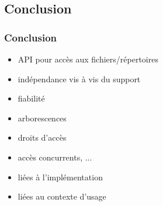 \subsection{Conclusion}
\begin{frame}
  \frametitle{Conclusion}

  \begin{itemize}
  \item API pour accès aux fichiers/répertoires
  \item indépendance vis à vis du support
  \item fiabilité
  \end{itemize}

  \begin{itemize}
  \item arborescences
  \item droits d'accès
  \item accès concurrents, ...
  \end{itemize}

  \begin{itemize}
  \item liées à l'implémentation
  \item liées au contexte d'usage
  \end{itemize}
\end{frame}




